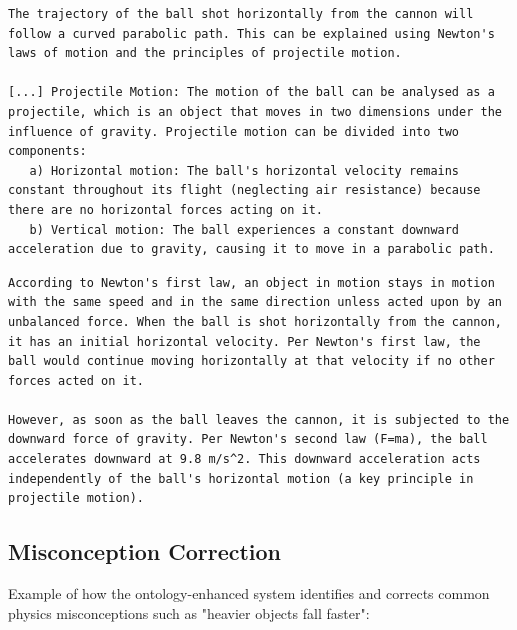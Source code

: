 \begin{lstlisting}[style=mystyle, caption={Baseline model explanation of projectile motion}, label={lst:baseline-projectile}]
The trajectory of the ball shot horizontally from the cannon will follow a curved parabolic path. This can be explained using Newton's laws of motion and the principles of projectile motion.

[...] Projectile Motion: The motion of the ball can be analysed as a projectile, which is an object that moves in two dimensions under the influence of gravity. Projectile motion can be divided into two components:
   a) Horizontal motion: The ball's horizontal velocity remains constant throughout its flight (neglecting air resistance) because there are no horizontal forces acting on it.
   b) Vertical motion: The ball experiences a constant downward acceleration due to gravity, causing it to move in a parabolic path.
\end{lstlisting}

\begin{lstlisting}[style=mystyle, caption={Ontology-enhanced model explanation of projectile motion}, label={lst:ontology-projectile}]
According to Newton's first law, an object in motion stays in motion with the same speed and in the same direction unless acted upon by an unbalanced force. When the ball is shot horizontally from the cannon, it has an initial horizontal velocity. Per Newton's first law, the ball would continue moving horizontally at that velocity if no other forces acted on it.

However, as soon as the ball leaves the cannon, it is subjected to the downward force of gravity. Per Newton's second law (F=ma), the ball accelerates downward at 9.8 m/s^2. This downward acceleration acts independently of the ball's horizontal motion (a key principle in projectile motion).
\end{lstlisting}

\subsection{Misconception Correction}
Example of how the ontology-enhanced system identifies and corrects common physics misconceptions such as "heavier objects fall faster":

